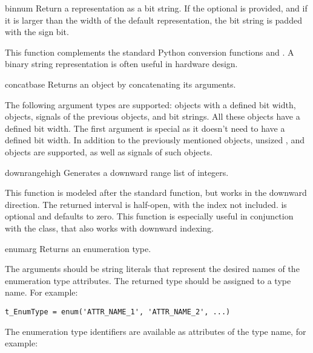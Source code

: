 \begin{funcdesc}{bin}{num }
Return a representation as a bit string.  If the optional 
is provided, and if it is larger than the width of the default
representation, the bit string is padded with the sign bit.

This function complements the standard Python conversion functions
 and . A binary string representation is often
useful in hardware design.
\end{funcdesc}

\begin{funcdesc}{concat}{base }
Returns an  object by concatenating its arguments.

The following argument types are supported:  objects with
a defined bit width,  objects, signals of the previous
objects, and bit strings. All these objects have a defined bit
width. The first argument  is special as it doesn't need to
have a defined bit width. In addition to the previously mentioned
objects, unsized ,  and  objects
are supported, as well as signals of such objects.
\end{funcdesc}

\begin{funcdesc}{downrange}{high }
Generates a downward range list of integers.

This function is modeled after the standard  function, but
works in the downward direction. The returned interval is half-open,
with the  index not included.  is optional and
defaults to zero.  This function is especially useful in conjunction
with the  class, that also works with downward indexing.
\end{funcdesc}

\begin{funcdesc}{enum}{arg }
Returns an enumeration type.

The arguments should be string literals that represent the desired
names of the enumeration type attributes.  The returned type should be
assigned to a type name.  For example:
\begin{verbatim}
t_EnumType = enum('ATTR_NAME_1', 'ATTR_NAME_2', ...)
\end{verbatim}
The enumeration type identifiers are available as attributes of
the type name, for example: 
\end{funcdesc}

